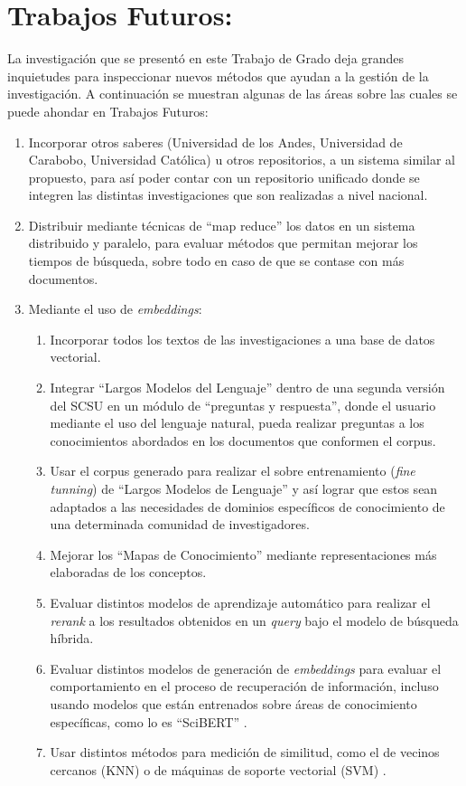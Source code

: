\documentclass[
  12pt,
  openany]{book}
\begin{document}
\hypertarget{conclusionestrabafutu}{%
\section{Trabajos Futuros:}\label{conclusionestrabafutu}}

La investigación que se presentó en este Trabajo de Grado deja grandes inquietudes para inspeccionar nuevos métodos que ayudan a la gestión de la investigación. A continuación se muestran algunas de las áreas sobre las cuales se puede ahondar en Trabajos Futuros:

\begin{enumerate}
\def\labelenumi{\arabic{enumi}.}
\item
  Incorporar otros saberes (Universidad de los Andes, Universidad de Carabobo, Universidad Católica) u otros repositorios, a un sistema similar al propuesto, para así poder contar con un repositorio unificado donde se integren las distintas investigaciones que son realizadas a nivel nacional.
\item
  Distribuir mediante técnicas de ``map reduce'' los datos en un sistema distribuido y paralelo, para evaluar métodos que permitan mejorar los tiempos de búsqueda, sobre todo en caso de que se contase con más documentos.
\item
  Mediante el uso de \emph{embeddings}:

  \begin{enumerate}
  \def\labelenumii{\arabic{enumii}.}
  \item
    Incorporar todos los textos de las investigaciones a una base de datos vectorial.
  \item
    Integrar ``Largos Modelos del Lenguaje'' dentro de una segunda versión del SCSU en un módulo de ``preguntas y respuesta'', donde el usuario mediante el uso del lenguaje natural, pueda realizar preguntas a los conocimientos abordados en los documentos que conformen el corpus.
  \item
    Usar el corpus generado para realizar el sobre entrenamiento (\emph{fine tunning}) de ``Largos Modelos de Lenguaje'' y así lograr que estos sean adaptados a las necesidades de dominios específicos de conocimiento de una determinada comunidad de investigadores.
  \item
    Mejorar los ``Mapas de Conocimiento'' mediante representaciones más elaboradas de los conceptos.
  \item
    Evaluar distintos modelos de aprendizaje automático para realizar el \emph{rerank} a los resultados obtenidos en un \emph{query} bajo el modelo de búsqueda híbrida.
  \item
    Evaluar distintos modelos de generación de \emph{embeddings} para evaluar el comportamiento en el proceso de recuperación de información, incluso usando modelos que están entrenados sobre áreas de conocimiento específicas, como lo es ``SciBERT'' \citep{beltagy2019}.
  \item
    Usar distintos métodos para medición de similitud, como el de vecinos cercanos (KNN) \citep{annoy2023} o de máquinas de soporte vectorial (SVM) \citep{svm2023}.
  \end{enumerate}
\end{enumerate}
\end{document}
